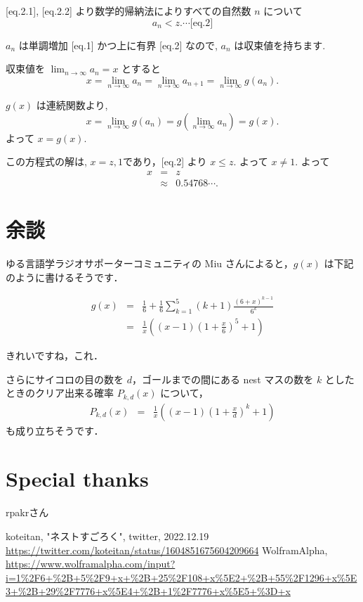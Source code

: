 \documentclass[a4j, 12pt]{jsarticle}
\renewcommand{\liminf}{\lim_{n\rightarrow\infty}}
\begin{document}
[eq.2.1], [eq.2.2] より数学的帰納法によりすべての自然数 $n$ について
\begin{equation*}
  a_n < z. \cdots \textrm{[eq.2]}
\end{equation*}

$a_n$ は単調増加 [eq.1] かつ上に有界 [eq.2] なので, $a_n$ は収束値を持ちます.

収束値を $\liminf a_n=x$ とすると
\begin{equation}
  x = \liminf a_n = \liminf a_{n+1} = \liminf g(a_n).
\end{equation}

$g(x)$ は連続関数より,
\begin{equation}
  x = \liminf g(a_n) =  g(\liminf a_n) = g(x).
\end{equation}
よって $x = g(x)$.

この方程式の解は, $x = z, 1$であり，[eq.2] より $x \leq z$. よって $x\neq 1$.  
よって
\begin{eqnarray}
  x&=&z\\
  &\approx& 0.54768\cdots.
\end{eqnarray}

\section{余談}
ゆる言語学ラジオサポーターコミュニティの Miu さんによると，$g(x)$ は下記のように書けるそうです．

\begin{eqnarray}
g(x)&=&\frac{1}{6}+\frac{1}{6}\sum_{k=1}^5(k+1)\frac{(6+x)^{k-1}}{6^k}\\
    &=&\frac{1}{x}\left((x-1)\left(1+\frac{x}{6}\right)^5+1\right)
\end{eqnarray}

きれいですね，これ．

さらにサイコロの目の数を $d$，ゴールまでの間にある nest マスの数を $k$ としたときのクリア出来る確率 $P_{k,d}(x)$ について，
\begin{eqnarray}
  P_{k,d}(x)&=&\frac{1}{x}\left((x-1)\left(1+\frac{x}{d}\right)^k+1\right)
\end{eqnarray}
も成り立ちそうです．

\section*{Special thanks}
rpakrさん

\begin{thebibliography}{99}
 koteitan, "ネストすごろく", twitter, 2022.12.19 \url{https://twitter.com/koteitan/status/1604851675604209664}
 WolframAlpha, \url{https://www.wolframalpha.com/input?i=1%2F6+%2B+5%2F9+x+%2B+25%2F108+x%5E2+%2B+55%2F1296+x%5E3+%2B+29%2F7776+x%5E4+%2B+1%2F7776+x%5E5+%3D+x}
\end{thebibliography}
\end{document}

